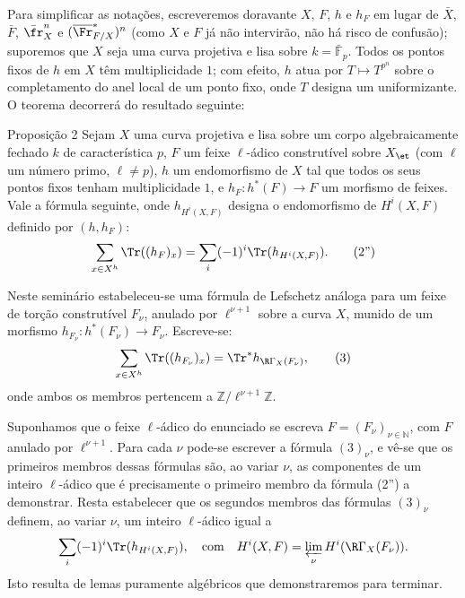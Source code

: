 Para simplificar as notações, escreveremos doravante $X$, $F$, $h$ e $h_F$ em lugar de $\bar X$, $\bar F$, $\bar{\fr}_X^n$ e $(\overline{\Fr}^*_{F/X})^n$ (como $X$ e $F$ já não intervirão, não há risco de confusão); suporemos que $X$ seja uma curva projetiva e lisa sobre $k=\bar{\mathbb F}_p$. Todos os pontos fixos de $h$ em $X$ têm multiplicidade $1$; com efeito, $h$ atua por $T\mapsto T^{p^n}$ sobre o completamento do anel local de um ponto fixo, onde $T$ designa um uniformizante. O teorema decorrerá do resultado seguinte:

\begin{statement}{Proposição 2}
Sejam $X$ uma curva projetiva e lisa sobre um corpo algebraicamente fechado $k$ de característica $p$, $F$ um feixe $\ell$-ádico construtível sobre $X_{\et}$ (com $\ell$ um número primo, $\ell\ne p$), $h$ um endomorfismo de $X$ tal que todos os seus pontos fixos tenham multiplicidade $1$, e $h_F:h^*(F)\to F$ um morfismo de feixes. Vale a fórmula seguinte, onde $h_{H^i(X,F)}$ designa o endomorfismo de $H^i(X,F)$ definido por $(h,h_F)$:
\[
\sum_{x\in X^h}\Tr((h_F)_x)=\sum_i(-1)^i\Tr(h_{H^i(X,F)}).
\tag{2''}
\]
\end{statement}

Neste seminário estabeleceu-se uma fórmula de Lefschetz análoga para um feixe de torção construtível $F_\nu$, anulado por $\ell^{\nu+1}$ sobre a curva $X$, munido de um morfismo $h_{F_\nu}:h^*(F_\nu)\to F_\nu$. Escreve-se:
\[
\sum_{x\in X^h}\Tr((h_{F_\nu})_x)=\Tr^*h_{\R\Gamma_X(F_\nu)},
\tag{3}
\]
onde ambos os membros pertencem a $\mathbb Z/\ell^{\nu+1}\mathbb Z$.

Suponhamos que o feixe $\ell$-ádico do enunciado se escreva $F=(F_\nu)_{\nu\in\mathbb N}$, com $F$ anulado por $\ell^{\nu+1}$. Para cada $\nu$ pode-se escrever a fórmula $(3)_\nu$, e vê-se que os primeiros membros dessas fórmulas são, ao variar $\nu$, as componentes de um inteiro $\ell$-ádico que é precisamente o primeiro membro da fórmula (2'') a demonstrar. Resta estabelecer que os segundos membros das fórmulas $(3)_\nu$ definem, ao variar $\nu$, um inteiro $\ell$-ádico igual a
\[
\sum_i(-1)^i\Tr(h_{H^i(X,F)}),
\quad\text{com}\quad
H^i(X,F)=\varprojlim_\nu H^i(\R\Gamma_X(F_\nu)).
\]
Isto resulta de lemas puramente algébricos que demonstraremos para terminar.
